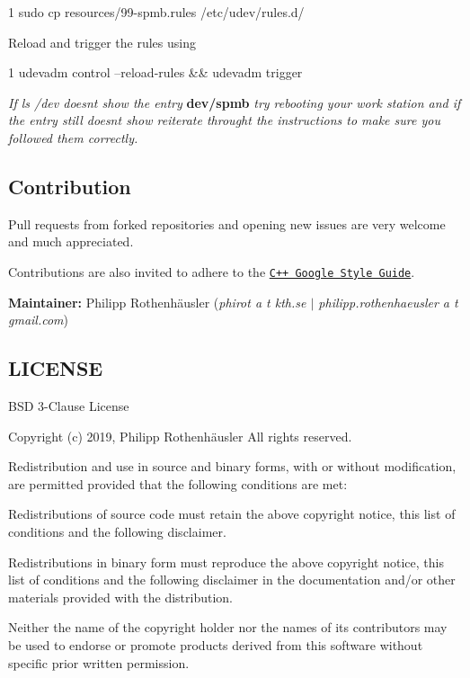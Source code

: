\begin{DoxyCode}
1 sudo cp resources/99-spmb.rules /etc/udev/rules.d/
\end{DoxyCode}



\begin{DoxyItemize}
\item Reload and trigger the rules using
\end{DoxyItemize}


\begin{DoxyCode}
1 udevadm control --reload-rules && udevadm trigger
\end{DoxyCode}


{\itshape If {\ttfamily ls /dev} doesn\textquotesingle{}t show the entry} {\bfseries dev/spmb} {\itshape try rebooting your work station and if the entry still doesn\textquotesingle{}t show reiterate throught the instructions to make sure you followed them correctly.}





\subsection*{Contribution}

Pull requests from forked repositories and opening new issues are very welcome and much appreciated.

Contributions are also invited to adhere to the \href{https://google.github.io/styleguide/cppguide.html}{\tt C++ Google Style Guide}.

{\bfseries Maintainer\+:} Philipp Rothenhäusler ({\itshape phirot a t kth.\+se $\vert$ philipp.\+rothenhaeusler a t gmail.\+com})





\subsection*{L\+I\+C\+E\+N\+SE}

B\+SD 3-\/\+Clause License

Copyright (c) 2019, Philipp Rothenhäusler All rights reserved.

Redistribution and use in source and binary forms, with or without modification, are permitted provided that the following conditions are met\+:


\begin{DoxyEnumerate}
\item Redistributions of source code must retain the above copyright notice, this list of conditions and the following disclaimer.
\item Redistributions in binary form must reproduce the above copyright notice, this list of conditions and the following disclaimer in the documentation and/or other materials provided with the distribution.
\item Neither the name of the copyright holder nor the names of its contributors may be used to endorse or promote products derived from this software without specific prior written permission.
\end{DoxyEnumerate}

